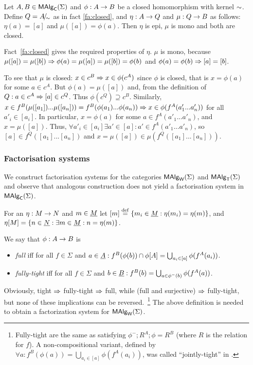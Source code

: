\documentclass[10pt]{article}
\begin{document}
\begin{Theorem}
\label{th:epimonoC}
Let $A,B \in \mbox{\rm\sf MAlg}_{\sf C}(\Sigma)$ and $\phi: A \rightarrow B$ be a closed homomorphism
with kernel $\sim$. Define $Q=A\!{\textstyle /}\!_{\sim}$ as in fact \ref{fa:closed},
and $\eta: A \rightarrow Q$ and $\mu:
Q \rightarrow B$ as follows: $\eta(a) = [a]$ and
$\mu([a]) = \phi(a)$. Then $\eta$ is epi, $\mu$ is mono
and both are closed.
\end{Theorem}

\begin{Proof}
Fact~\ref{fa:closed} gives the required properties of $\eta$.
$\mu$ is mono, because  $\mu([a])=\mu([b]) \Rightarrow
\phi(a)=\mu([a])=\mu([b])=\phi(b)$ and $\phi(a)=\phi(b)\Rightarrow
[a]=[b]$.

To see that $\mu$ is closed: $x\in c^B\Rightarrow x\in \phi(c^A)$ since
$\phi$ is closed, that is $x=\phi(a)$ for some $a\in c^A$. But
$\phi(a)=\mu([a])$ and, from the definition of $Q:a\in c^A \Rightarrow
[a]\in c^Q$. Thus $\phi(c^Q)\supseteq c^B$.
Similarly, $x\in
f^B(\mu([a_1])...\mu([a_n]))=f^B(\phi(a_1)...\phi(a_n))
\Rightarrow x\in \phi(f^A(a'_1...a'_n))$ for all $a'_i\in[a_i]$. 
In
particular, $x=\phi(a)$ for some $a\in f^A(a'_1...a'_n)$, and
$x=\mu([a])$. 
Thus, $\forall a'_i\in[a_i]\exists a'\in[a]:a'\in f^A(a'_1...a'_n)$,
so $[a]\in f^Q([a_1]...[a_n])$ and $x=\mu([a])\in \mu(f^Q([a_1]...[a_n]))$.
\end{Proof}

\subsubsection*{Factorisation systems}
We construct factorisation systems for the categories $\mbox{\rm\sf MAlg}_{\sf W}(\Sigma)$ and $\mbox{\rm\sf MAlg}_{\sf T}(\Sigma)$
and observe that analogous construction does not yield a factorisation
system in $\mbox{\rm\sf MAlg}_{\sf C}(\Sigma)$.

For an $\eta:M\rightarrow N$ and $m\in\underline {M}$ let $[m] \stackrel{{\rm \tiny{def}}}= \{m_i\in\underline {M}:\eta(m_i)=\eta(m)\}$, and $\eta[M]=\{n\in\underline {N}:\exists m\in\underline {M}: n=\eta(m)\}$.

\begin{Definition}
\label{de:jtight}
We say that  $\phi:A\rightarrow B$ is
\begin{itemize}\MyLPar
\item
{\em full} iff for all $f\in\Sigma$ and
$a\in\underline {A} : f^B(\phi(b)) \cap \phi[A] = \bigcup_{a_i\in [a]} \phi(f^A(a_i))$.
\item
{\em fully-tight} iff for all $f\in\Sigma$ and
$b\in\underline {B} : f^B(b) = \bigcup_{a\in \phi^{-}(b)} \phi(f^A(a))$.
\end{itemize}
\end{Definition}
%
Obviously, tight $\Rightarrow$ fully-tight $\Rightarrow$ full, while (full and
surjective) $\Rightarrow$ fully-tight, but none of these implications can be
reversed.~\footnote{Fully-tight are the same as satisfying
$\phi^-;R^A;\phi=R^B$ (where $R$ is the relation for $f$). A
non-compositional variant, defined by $\forall a:f^B(\phi(a)) =
\bigcup_{a_i\in [a]} \phi(f^A(a_i))$, was called ``jointly-tight'' in
\cite{c:132}.}  The above definition is needed to obtain a
factorization system for $\mbox{\rm\sf MAlg}_{\sf W}(\Sigma)$.
\end{document}
